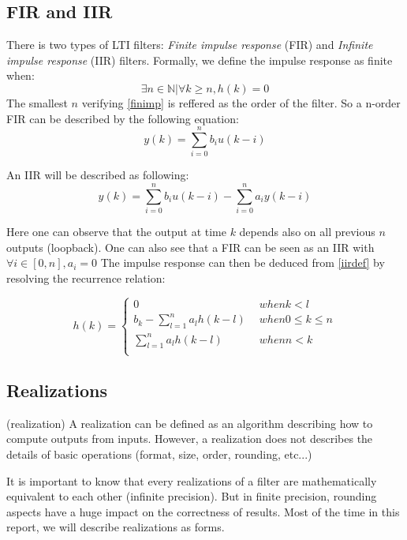 	\subsection{FIR and IIR}
	There is two types of LTI filters: \textit{Finite impulse response} (FIR) and \textit{Infinite impulse response} (IIR) filters.
	Formally, we define the impulse response as finite when:
	\begin{equation} \label{finimp}
		\exists n \in \mathbb{N} | \forall k \geq n, h(k)=0
	\end{equation}
	The smallest $n$ verifying \ref{finimp} is reffered as the order of the filter. So a n-order FIR can be described by the
	following equation:
	\begin{equation} \label{firdef}
		y(k)=\sum_{i=0}^n b_i u(k-i)
	\end{equation}

	An IIR will be described as following:
	\begin{equation} \label{iirdef}
		y(k)=\sum_{i=0}^n b_i u(k-i) - \sum_{i=0}^n a_i y(k-i)
	\end{equation}

	Here one can observe that the output at time $k$ depends also on all previous $n$ outputs (loopback). One can
	also see that a FIR can be seen as an IIR with $\forall i \in [0,n],a_i=0$
	The impulse response can then be deduced from \ref{iirdef} by resolving the recurrence relation:

	\begin{equation}
		h(k) =
		\begin{cases}
			0 & \hspace{5pt} when k<l\\
			b_k - \sum_{l=1}^n a_l h(k-l) & \hspace{5pt} when 0\leq k \leq n\\
			\sum_{l=1}^n a_l h(k-l) & \hspace{5pt} when n< k\\
		\end{cases}
	\end{equation}

	\subsection{Realizations}
	\begin{thdef} (realization)
	A realization can be defined as an algorithm describing how to compute outputs
	from inputs. However, a realization does not describes the details of basic operations (format, size, order,
	rounding, etc...)
	\end{thdef}
	It is important to know that every realizations of a filter are mathematically equivalent to each other (infinite
	precision). But in finite precision, rounding aspects have a huge impact on the correctness of results.
	Most of the time in this report, we will describe realizations as forms.

